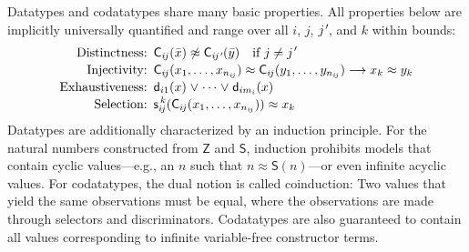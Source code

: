 \documentclass[letter]{article}
\theoremstyle{definition}
\newcommand\jPrime{j\vthinspace'\negvthinspace}
\newcommand\const[1]{\textsf{#1}}
\newcommand\medrightarrow{\mathrel{{{\color{black}\relbar}\kern-0.9ex\rlap{\color{white}\ensuremath{\blacksquare}}\kern-0.9ex}\joinrel{\color{black}\rightarrow}}}
\newcommand{\teq}{\approx}
\newcommand{\tneq}{\not\teq}
\newcommand\vthinspace{\kern+0.083333em}
\newcommand\negvthinspace{\kern-0.083333em}
\begin{document}
Datatypes and codatatypes share many basic properties. All properties
below are implicitly universally quantified and range over all $i$, $j$,
$\jPrime$, and $k$ within bounds:
%
\[
\begin{aligned}[t]
\text{Distinctness:}\enskip
  & %
    \smash{\const{C}_{i\negvthinspace j}(\bar x) \tneq \const{C}_{i\negvthinspace \jPrime}(\bar y) \quad\text{if $j \not= \jPrime$}}
  \\[-0.5\jot]
\text{Injectivity:}\enskip
  & %
    \smash{\const{C}_{i\negvthinspace j}(x_1,\ldots,x_{n_{i\negvthinspace j}}) \teq \const{C}_{i\negvthinspace j}(y_1,\ldots,y_{n_{i\negvthinspace j}}) \medrightarrow x_k \teq y_k}
  \\[-0.5\jot]
\text{Exhaustiveness:}\enskip
  & \smash{\const{d}_{i1}(x) \mathrel\lor \cdots \mathrel\lor \const{d}_{im_i}(x)}
  \\[-0.5\jot]
\text{Selection:}\enskip
  & \smash{\const{s}_{i\negvthinspace j}^{\,k}(\const{C}_{i\negvthinspace j}(x_1,\ldots,x_{n_{i\negvthinspace j}})) \teq x_k}
\end{aligned}
\]
%
%
%
%
%
Datatypes are additionally characterized by an induction principle.
For the natural numbers constructed from $\const{Z}$ and $\const{S}$,
induction prohibits models that contain cyclic values---e.g.,
an $n$ such that $n \teq \const{S}(n)$---or even infinite acyclic values.
%
For codatatypes, the dual notion is called coinduction:
Two values that yield the same observations must be equal, 
where the observations are made through selectors and discriminators.
Codatatypes are also guaranteed to contain all values corresponding to 
infinite variable-free constructor terms.
\end{document}
